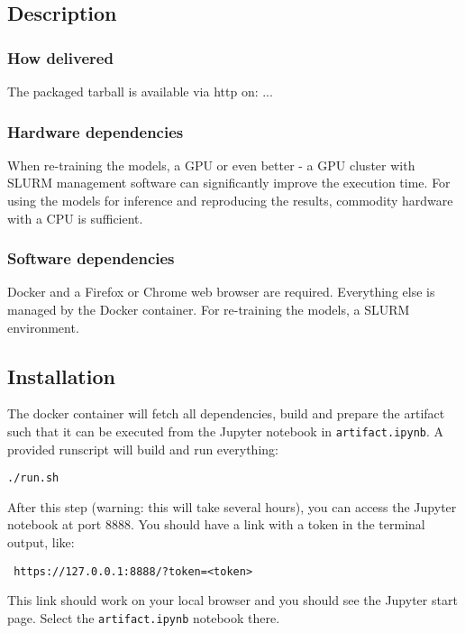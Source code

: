 \subsection{Description}

\subsubsection{How delivered}

The packaged tarball is available via http on: ...

\subsubsection{Hardware dependencies}
When re-training the models, a GPU or even better - a GPU cluster with SLURM management software can significantly improve the execution time. For using the models for inference and reproducing the results, commodity hardware with a CPU is sufficient.
\subsubsection{Software dependencies}
Docker and a Firefox or Chrome web browser are required. Everything else is managed by the Docker container.
For re-training the models, a SLURM environment.

\subsection{Installation}
The docker container will fetch all dependencies, build and prepare the artifact such that it can be executed from the Jupyter notebook in \texttt{artifact.ipynb}. A provided runscript will build and run everything:

\begin{lstlisting}
./run.sh
\end{lstlisting}

After this step (warning: this will take several hours), you can access the Jupyter notebook at port 8888. You should have a link with a token in the terminal output, like: 
 
\begin{lstlisting}
 https://127.0.0.1:8888/?token=<token>
\end{lstlisting}

This link should work on your local browser and you should see the Jupyter start page. Select the \texttt{artifact.ipynb} notebook there.

